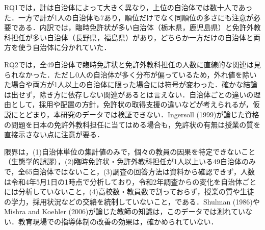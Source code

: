 \documentclass[a4paper,10pt,twocolumn]{ltjsarticle}
\makeatletter
\renewcommand{\section}{\@startsection{section}{1}{\z@}{1.1\Cvs \@plus.4\Cdp \@minus.2\Cdp}{.5\Cvs \@plus.2\Cdp}{\normalfont\gtfamily\bfseries\large}}
\makeatother
\begin{document}
\section{考察}
RQ1では，計は自治体によって大きく異なり，上位の自治体では数十人であった．一方で計が1人の自治体も7あり，順位だけでなく同順位の多さにも注意が必要である．内訳では，臨時免許状が多い自治体（栃木県，鹿児島県）と免許外教科担任が多い自治体（長野県，福島県）があり，どちらか一方だけの自治体と両方を使う自治体に分かれていた．

RQ2では，全49自治体で臨時免許状と免許外教科担任の人数に直線的な関連は見られなかった．ただし0人の自治体が多く分布が偏っているため，外れ値を除いた場合や両方が1人以上の自治体に限った場合には符号が変わった．確かな結論は出せず，除き方に依存しない関連があるとは言えない．自治体ごとの違いの理由として，採用や配置の方針，免許状の取得支援の違いなどが考えられるが，仮説にとどまり，本研究のデータでは検証できない．Ingersoll (1999)が論じた資格の問題を日本の免許外教科担任に当てはめる場合も，免許状の有無は授業の質を直接示さない点に注意が要る．

限界は，(1)自治体単位の集計値のみで，個々の教員の因果を特定できないこと（生態学的誤謬），(2)臨時免許状・免許外教科担任が1人以上いる49自治体のみで，全65自治体ではないこと，(3)調査の回答方法は資料から確認できず，人数は令和4年5月1日の1時点で分析しており，令和2年調査からの変化を自治体ごとには分析していないこと，(4)高校数・教員数で割っておらず，授業の質や生徒の学力，採用状況などの交絡を統制していないこと，である．Shulman (1986)やMishra and Koehler (2006)が論じた教師の知識は，このデータでは測れていない．教育現場での指導体制の改善の効果は，確かめられていない．
\end{document}
